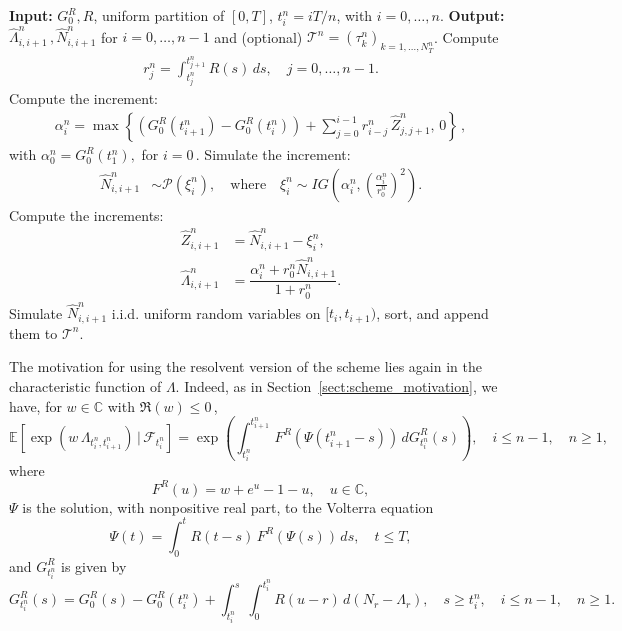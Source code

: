 \documentclass{article}
\newcommand{\1}{\mathbbm{1}}
\numberwithin{equation}{section}
\begin{document}
\begin{algorithm}[H]\label{algo:ivi_res}
\caption{ \textbf{- The Hawkes Resolvent iVi scheme:} Simulation of \( \widehat \Lambda\,, \widehat N \)}\label{alg:simulation_res}
\begin{algorithmic}[1]
\State \textbf{Input:} \( G_0^R, R \), uniform partition of $[0,T]$, \( t_i^n = i T/n  \), with $i=0,\ldots, n$.
\State \textbf{Output:} \(  \widehat \Lambda^n_{i, i+1}\,, \widehat N^n_{i, i+1} \) for \( i = 0, \ldots, n-1 \) and (optional) $\mathcal{T}^n = (\tau_k^n)_{k=1, \ldots, N_T^n}$.
\State Compute
\begin{align}\label{eq:kij_res}
r_{j}^n = \int_{t_j^n}^{t_{j+1}^n} R\left(s\right) \, ds, \quad {j=0,\ldots, n-1}.
\end{align}
\State Compute the increment:
\begin{align}\label{eq:alphai_res}
    \alpha_i^n  = \max\left\{(G_0^R(t^n_{i+1}) - G_0^R(t^n_{i})) + \sum_{j=0}^{i-1}   r^n_{i-j}\,\widehat Z^n_{j,j+1},\, 0 \right\}\,,  
\end{align}
with  $\alpha^n_0=G_0^R(t^n_{1}),$  for $i=0$\,.
    \State Simulate the increment:
\begin{align}
    \label{eq:hatNsample_res}
    \widehat N^n_{i,i+1} &\sim \mathcal P\left(\xi^n_{i}\right), \quad\text{where} \quad \xi^n_{i} \sim IG\left({\alpha_i^n},\left(\frac{\alpha_i^n}
    {r_{0}^n}\right)^2 \right).
\end{align}
    \State Compute the increments:
\begin{align}
    \widehat Z^n_{i,i+1} &= \widehat N^n_{i,i+1} - \xi^n_{i}, \\
    \widehat\Lambda^n_{i, i+1} &= \dfrac{\alpha_i^n + r_0^n \widehat N^n_{i,i+1}}{1 + r_0^n}. \label{eq:lam_inc_res}
\end{align}
 Simulate $\widehat N^n_{i,i+1}$ i.i.d. uniform random variables on $[t_i, t_{i+1})$, sort, and append them to $\mathcal{T}^n$.
\EndFor

\end{algorithmic}
\end{algorithm}

The motivation for using the resolvent version of the scheme lies again in the characteristic function of $\Lambda$. Indeed, as in Section~\ref{sect:scheme_motivation}, we have,
for $w \in \mathbb C$ with $\Re(w) \leq 0\,$, 
$$
\mathbb{E} \left[\exp\left(w\, \Lambda_{t^n_i, t^n_{i+1}}\right)\,\big|\, \mathcal{F}_{t^n_i} \right] = \exp\left(\int_{t^n_i}^{t^n_{i+1}}\,F^R(\Psi(t^n_{i+1} - s))\,dG_{t^n_i}^R(s)\right), \quad i \leq n-1,\quad n \geq 1,
$$
where
\begin{equation}\label{eq:F_R_def}
    F^R(u) = w + e^{u} - 1 - u, \quad u \in \mathbb{C},
\end{equation}
$\Psi$ is the solution, with nonpositive real part, to the Volterra equation
$$
\Psi(t) = \int_0^t R(t-s)\,F^R(\Psi(s))\,ds, \quad t \leq T,
$$
and $G_{t^n_i}^R$ is given by
\begin{equation*}
    G_{t^n_i}^R(s) = G_0^R(s) - G_0^R(t^n_i) + \int_{t^n_i}^s \int_0^{t^n_i} R(u-r)\,d(N_r - \Lambda_r), \quad s \geq t^n_i,\quad i \leq n-1,\quad n \geq 1.
\end{equation*}
\end{document}
